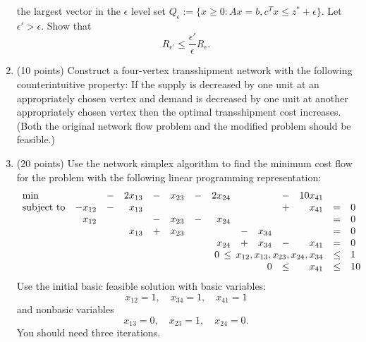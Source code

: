 \documentclass[12pt]{article}
\begin{document}
\begin{enumerate}
the largest vector in the $\epsilon$ level set
$Q_{\epsilon}:=\{x \geq 0: Ax=b, c^Tx \leq z^* + \epsilon \}$.
Let $\epsilon' > \epsilon$. Show that
\begin{displaymath}
R_{\epsilon'} \leq \frac{\epsilon'}{\epsilon} R_{\epsilon}.
\end{displaymath}
  \item  (10 points)
Construct a four-vertex transshipment network with the following counterintuitive property:
If the supply is decreased by one unit at an appropriately chosen vertex and demand is decreased by one unit at
another appropriately  chosen vertex then the optimal transshipment cost increases.
(Both the original network flow problem and the modified problem should
be feasible.)
\item (20 points)
Use the network simplex algorithm to find the minimum cost flow for the problem with 
the following linear programming representation:
\begin{displaymath}
\begin{array}{lrcrcrcrcrcrcl}
\min & & - & 2x_{13}& - & x_{23} & - & 2x_{24} &&& - & 10 x_{41} \\
\mbox{subject to} & -x_{12} & - & x_{13} &&&&&&& + & x_{41} & = & 0 \\
& x_{12} &&& - & x_{23} & - & x_{24} &&&&& = & 0 \\
&&& x_{13} & + & x_{23} &&& - & x_{34} &&& = & 0 \\
&&&&&&& x_{24} & + & x_{34} & - & x_{41} & = & 0 \\
& \multicolumn{11}{r}{0 \, \leq \, x_{12}, x_{13}, x_{23}, x_{24}, x_{34}} & \leq & 1 \\
&&&&&&&&& 0 & \leq & x_{41} & \leq & 10
\end{array}
\end{displaymath}
Use the initial basic feasible solution with basic variables:
\begin{displaymath}
x_{12} = 1, \quad x_{34}=1, \quad x_{41}=1
\end{displaymath}
and nonbasic variables
\begin{displaymath}
x_{13}=0, \quad x_{23}=1, \quad x_{24}=0.
\end{displaymath}
You should need three iterations.
\end{enumerate}
\end{document}
